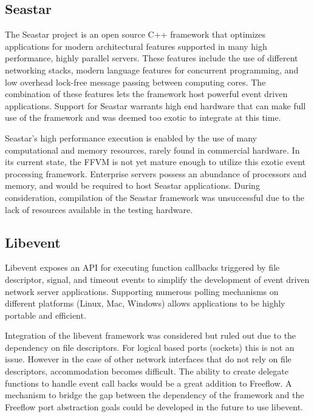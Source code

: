 \subsection{Seastar}
\label{related:seastar}
The Seastar project \cite{seastar} is an open source C++ framework that
optimizes applications for modern architectural features supported in many high
performance, highly parallel servers. These features include the use of different
networking stacks, modern language features for concurrent programming, and low
overhead lock-free message passing between computing cores. The combination of
these features lets the framework host powerful event driven applications.
Support for Seastar warrants high end hardware that can make full use of the
framework and was deemed too exotic to integrate at this time.

Seastar's high performance execution is enabled by the use of many computational
and memory resources, rarely found in commercial hardware. In its current state,
the FFVM is not yet mature enough to utilize this exotic event
processing framework. Enterprise servers possess an abundance of processors and
memory, and would be required to host Seastar applications. During consideration,
compilation of the Seastar framework was unsuccessful due to the lack of
resources available in the testing hardware.

\subsection{Libevent}
\label{related:libevent}
Libevent \cite{libevent} exposes an API for executing function callbacks
triggered by file descriptor, signal, and timeout events to simplify the
development of event driven network server applications. Supporting numerous
polling mechanisms on different platforms (Linux, Mac, Windows) allows
applications to be highly portable and efficient.

Integration of the libevent framework was considered but ruled out due to the
dependency on file descriptors. For logical based ports (sockets) this is
not an issue. However in the case of other network interfaces that do not
rely on file descriptors, accommodation becomes difficult. The ability to
create delegate functions to handle event call backs would be a great addition
to Freeflow. A mechanism to bridge the gap between the dependency of the
framework and the Freeflow port abstraction goals could be developed in the
future to use libevent.
